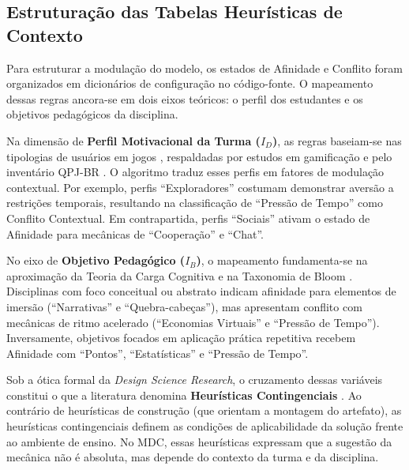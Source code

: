 
\subsection{Estruturação das Tabelas Heurísticas de Contexto}
\label{subsec:matrizes}

Para estruturar a modulação do modelo, os estados de Afinidade e Conflito foram organizados em dicionários de configuração no código-fonte. O mapeamento dessas regras ancora-se em dois eixos teóricos: o perfil dos estudantes e os objetivos pedagógicos da disciplina.

Na dimensão de \textbf{Perfil Motivacional da Turma ($I_D$)}, as regras baseiam-se nas tipologias de usuários em jogos \cite{bartle1996hearts, yee2006motivations}, respaldadas por estudos em gamificação \cite{hamari2014player} e pelo inventário QPJ-BR \cite{andrade2016qpj}. O algoritmo traduz esses perfis em fatores de modulação contextual. Por exemplo, perfis ``Exploradores'' costumam demonstrar aversão a restrições temporais, resultando na classificação de ``Pressão de Tempo'' como Conflito Contextual. Em contrapartida, perfis ``Sociais'' ativam o estado de Afinidade para mecânicas de ``Cooperação'' e ``Chat''.

No eixo de \textbf{Objetivo Pedagógico ($I_B$)}, o mapeamento fundamenta-se na aproximação da Teoria da Carga Cognitiva e na Taxonomia de Bloom \cite{anderson2001taxonomy, ferraz2010taxonomia}. Disciplinas com foco conceitual ou abstrato indicam afinidade para elementos de imersão (``Narrativas'' e ``Quebra-cabeças''), mas apresentam conflito com mecânicas de ritmo acelerado (``Economias Virtuais'' e ``Pressão de Tempo''). Inversamente, objetivos focados em aplicação prática repetitiva recebem Afinidade com ``Pontos'', ``Estatísticas'' e ``Pressão de Tempo''.

Sob a ótica formal da \textit{Design Science Research}, o cruzamento dessas variáveis constitui o que a literatura denomina \textbf{Heurísticas Contingenciais} \cite{dresch2014design}. Ao contrário de heurísticas de construção (que orientam a montagem do artefato), as heurísticas contingenciais definem as condições de aplicabilidade da solução frente ao ambiente de ensino. No MDC, essas heurísticas expressam que a sugestão da mecânica não é absoluta, mas depende do contexto da turma e da disciplina.

